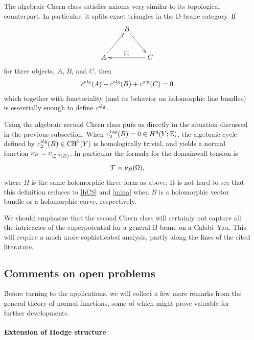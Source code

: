 The algebraic Chern class satisfies axioms very similar to its topological
counterpart. In particular, it splits exact triangles in the D-brane 
category. If
\begin{equation}
\xymatrix@R=1cm@C=0.7cm{
& B \ar[dr]^{} & \\
\ar[ur]^{} A && \ar[ll]_{[1]} C 
}
\end{equation}
for three objects, $A$, $B$, and $C$, then
\begin{equation}
c^{\rm alg}(A) - c^{\rm alg}(B) + c^{\rm alg}(C) = 0
\end{equation}
which together with functoriality (and its behavior on holomorphic
line bundles) is essentially enough to define
$c^{\rm alg}$.

Using the algebraic second Chern class puts us directly in the situation 
discussed in the previous subsection. When $c_2^{\rm top}(B)=0\in H^4(Y;{\mathbb Z})$, 
the algebraic cycle defined by $c_2^{\rm alg}(B)\in \mathop{\rm CH}^2(Y)$ is 
homologically trivial, and yields a normal function
$\nu_B= \nu_{c_2^{\rm alg}(B)}$. In particular the formula
for the domainwall tension is
\begin{equation}
{\cal T} = \nu_{B} (\Omega) ,
\end{equation}
where $\Omega$ is the same holomorphic three-form as above.
It is not hard to see that this definition reduces to \eqref{hCS}
and \eqref{mina} when $B$ is a holomorphic vector bundle or a
holomorphic curve, respectively. 

We should emphasize that the second Chern class will certainly not 
capture all the intricacies of the superpotential for a general B-brane 
on a Calabi--Yau. This will require a much more sophisticated analysis,
partly along the lines of the cited literature.


\subsection{Comments on open problems}

Before turning to the applications, we will collect a few more
remarks from the general theory of normal functions, some
of which might prove valuable for further developments.

\paragraph{Extension of Hodge structure}

